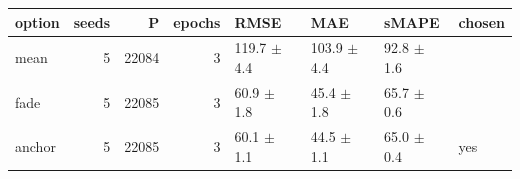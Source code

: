 \begin{tabular}{lrrrllll}
\toprule
option & seeds & P & epochs & RMSE & MAE & sMAPE & chosen \\
\midrule
mean & 5 & 22084 & 3 & 119.7 $\pm$ 4.4 & 103.9 $\pm$ 4.4 & 92.8 $\pm$ 1.6 &  \\
fade & 5 & 22085 & 3 & 60.9 $\pm$ 1.8 & 45.4 $\pm$ 1.8 & 65.7 $\pm$ 0.6 &  \\
anchor & 5 & 22085 & 3 & 60.1 $\pm$ 1.1 & 44.5 $\pm$ 1.1 & 65.0 $\pm$ 0.4 & yes \\
\bottomrule
\end{tabular}
